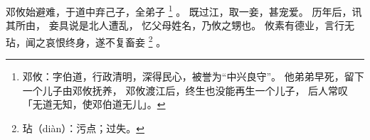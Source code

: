 
\switchcolumn*[\section{}]

邓攸始避难，于道中弃己子，全弟子%
\footnote{%
    邓攸：字伯道，行政清明，深得民心，被誉为“中兴良守”。
          他弟弟早死，留下一个儿子由邓攸抚养，
          邓攸渡江后，终生也没能再生一个儿子，
          后人常叹「无道无知，使邓伯道无儿」。
}%
。
既过江，取一妾，甚宠爱。
历年后，讯其所由，
妾具说是北人遭乱，
忆父母姓名，乃攸之甥也。
攸素有德业，言行无玷，闻之哀恨终身，遂不复畜妾%
\footnote{%
    玷（diàn）：污点；过失。
}%
。

\switchcolumn



